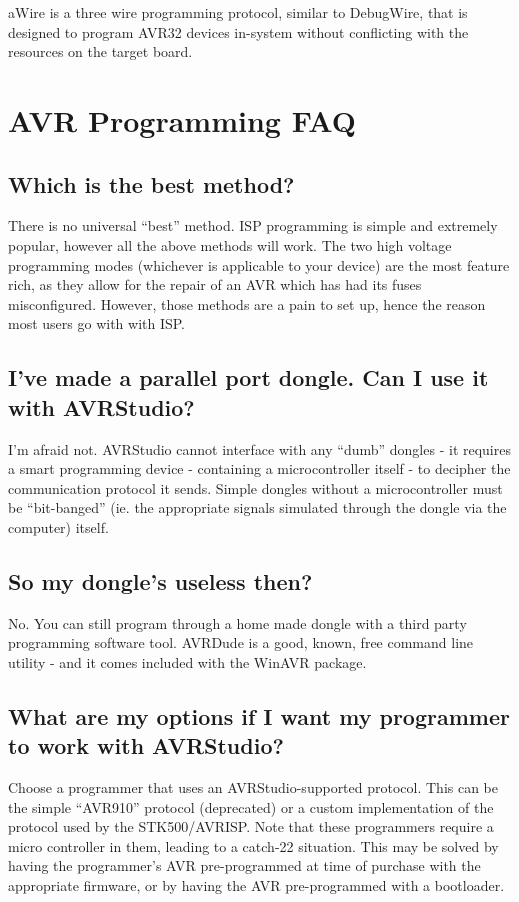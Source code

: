 \documentclass[a4paper,oneside,notitlepage]{book}
\begin{document}
aWire is a three wire programming protocol, similar to DebugWire, that is designed to program AVR32 devices in-system without conflicting with the resources on the target board.



\label{chp:faq}
\chapter{AVR Programming FAQ}

\section{Which is the best method?}
There is no universal ``best'' method. ISP programming is simple and extremely popular, however all the above methods will work. The two high voltage programming modes (whichever is applicable to your device) are the most feature rich, as they allow for the repair of an AVR which has had its fuses misconfigured. However, those methods are a pain to set up, hence the reason most users go with with ISP.

\section{I've made a parallel port dongle. Can I use it with AVRStudio?}
I'm afraid not. AVRStudio cannot interface with any ``dumb'' dongles - it requires a smart programming device - containing a microcontroller itself - to decipher the communication protocol it sends. Simple dongles without a microcontroller must be ``bit-banged'' (ie. the appropriate signals simulated through the dongle via the computer) itself.

\section{So my dongle's useless then?}
No. You can still program through a home made dongle with a third party programming software tool. AVRDude is a good, known, free command line utility - and it comes included with the WinAVR package.

\section{What are my options if I want my programmer to work with AVRStudio?}
Choose a programmer that uses an AVRStudio-supported protocol. This can be the simple ``AVR910'' protocol (deprecated) or a custom implementation of the protocol used by the STK500/AVRISP. Note that these programmers require a micro controller in them, leading to a catch-22 situation. This may be solved by having the programmer's AVR pre-programmed at time of purchase with the appropriate firmware, or by having the AVR pre-programmed with a bootloader.
\end{document}
